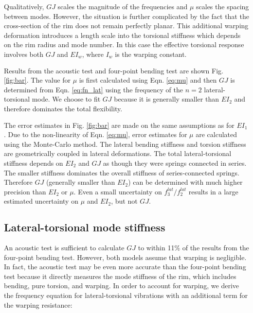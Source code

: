 \documentclass[../thesis.tex]{subfiles}
\begin{document}
Qualitatively, $GJ$ scales the magnitude of the frequencies and $\mu$ scales the spacing between modes. However, the situation is further complicated by the fact that the cross-section of the rim does not remain perfectly planar. This additional warping deformation introduces a length scale into the torsional stiffness which depends on the rim radius and mode number. In this case the effective torsional response involves both $GJ$ and $EI_w$, where $I_w$ is the warping constant.

Results from the acoustic test and four-point bending test are shown Fig. \ref{fig:bar}. The value for $\mu$ is first calculated using Eqn. \eqref{eq:mu} and then $GJ$ is determined from Eqn. \eqref{eq:fn_lat} using the frequency of the $n=2$ lateral-torsional mode. We choose to fit $GJ$ because it is generally smaller than $EI_{2}$ and therefore dominates the total flexibility.

The error estimates in Fig. \ref{fig:bar} are made on the same assumptions as for $EI_1$. Due to the non-linearity of Eqn. \eqref{eq:mu}, error estimates for $\mu$ are calculated using the Monte-Carlo method. The lateral bending stiffness and torsion stiffness are geometrically coupled in lateral deformations. The total lateral-torsional stiffness depends on $EI_{2}$ and $GJ$ as though they were springs connected in series. The smaller stiffness dominates the overall stiffness of series-connected springs. Therefore $GJ$ (generally smaller than $EI_{2}$) can be determined with much higher precision than $EI_{2}$ or $\mu$. Even a small uncertainty on $f_3^{lat}/f_2^{lat}$ results in a large estimated uncertainty on $\mu$ and $EI_{2}$, but not $GJ$.

\subsection{Lateral-torsional mode stiffness}
An acoustic test is sufficient to calculate $GJ$ to within 11\% of the results from the four-point bending test. However, both models assume that warping is negligible. In fact, the acoustic test may be even more accurate than the four-point bending test because it directly measures the mode stiffness of the rim, which includes bending, pure torsion, and warping. In order to account for warping, we derive the frequency equation for lateral-torsional vibrations with an additional term for the warping resistance:
\end{document}
